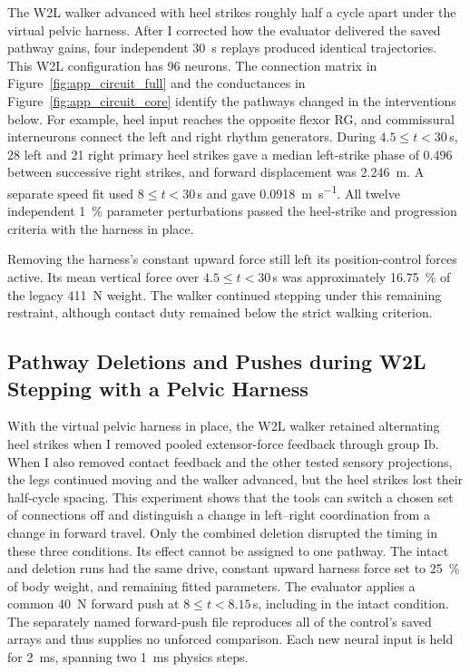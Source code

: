 The W2L walker advanced with heel strikes roughly half a cycle apart under the virtual pelvic harness. After I corrected how the evaluator delivered the saved pathway gains, four independent \qty{30}{\second} replays produced identical trajectories. This W2L configuration has 96 neurons. The connection matrix in Figure~\ref{fig:app_circuit_full} and the conductances in Figure~\ref{fig:app_circuit_core} identify the pathways changed in the interventions below. For example, heel input reaches the opposite flexor RG, and commissural interneurons connect the left and right rhythm generators. During $4.5\leq t<30$\,s, 28 left and 21 right primary heel strikes gave a median left-strike phase of 0.496 between successive right strikes, and forward displacement was \qty{2.246}{\meter}. A separate speed fit used $8\leq t<30$\,s and gave \qty{0.0918}{\meter\per\second}. All twelve independent \qty{1}{\percent} parameter perturbations passed the heel-strike and progression criteria with the harness in place.

Removing the harness's constant upward force still left its position-control forces active. Its mean vertical force over $4.5\leq t<30$\,s was approximately \qty{16.75}{\percent} of the legacy \qty{411}{\newton} weight. The walker continued stepping under this remaining restraint, although contact duty remained below the strict walking criterion.

\subsection{Pathway Deletions and Pushes during W2L Stepping with a Pelvic Harness}\label{sec:app_w2l_perturbations}

With the virtual pelvic harness in place, the W2L walker retained alternating heel strikes when I removed pooled extensor-force feedback through group Ib. When I also removed contact feedback and the other tested sensory projections, the legs continued moving and the walker advanced, but the heel strikes lost their half-cycle spacing. This experiment shows that the tools can switch a chosen set of connections off and distinguish a change in left--right coordination from a change in forward travel. Only the combined deletion disrupted the timing in these three conditions. Its effect cannot be assigned to one pathway. The intact and deletion runs had the same drive, constant upward harness force set to \qty{25}{\percent} of body weight, and remaining fitted parameters. The evaluator applies a common \qty{40}{\newton} forward push at $8\leq t<8.15$\,s, including in the intact condition. The separately named forward-push file reproduces all of the control's saved arrays and thus supplies no unforced comparison. Each new neural input is held for \qty{2}{\milli\second}, spanning two \qty{1}{\milli\second} physics steps.

